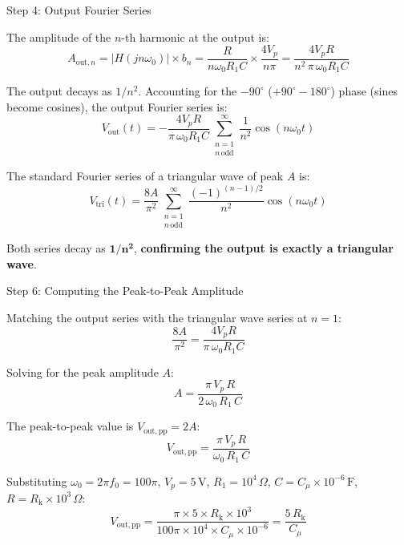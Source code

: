 \documentclass{beamer}
\numberwithin{equation}{section}
\theoremstyle{remark}
\begin{document}
\begin{frame}{Step 4: Output Fourier Series}
 
The amplitude of the $n$-th harmonic at the output is:
\[
  A_{\mathrm{out},n}
  = \left|H(jn\omega_0)\right| \times b_n
  = \frac{R}{n\omega_0 R_1 C} \times \frac{4V_p}{n\pi}
  = \frac{4V_p R}{n^2\,\pi\,\omega_0 R_1 C}
\]
 
The output decays as $1/n^2$. Accounting for the $-90^\circ$ ($+90^\circ - 180^\circ$) phase
(sines become cosines), the output Fourier series is:
\[
  V_{\mathrm{out}}(t)
  = -\frac{4V_p R}{\pi\,\omega_0 R_1 C}
    \sum_{\substack{n=1 \\ n\,\mathrm{odd}}}^{\infty}
    \frac{1}{n^2}\cos(n\omega_0 t)
\]
 
The standard Fourier series of a triangular wave of peak $A$ is:
\[
  V_{\mathrm{tri}}(t)
  = \frac{8A}{\pi^2}
    \sum_{\substack{n=1 \\ n\,\mathrm{odd}}}^{\infty}
    \frac{(-1)^{(n-1)/2}}{n^2}\cos(n\omega_0 t)
\]
 
Both series decay as $\mathbf{1/n^2}$, \textbf{confirming the output
is exactly a triangular wave}.
 
\end{frame}
 
 
\begin{frame}{Step 6: Computing the Peak-to-Peak Amplitude}
 
Matching the output series with the triangular wave series at $n=1$:
\[
  \frac{8A}{\pi^2} = \frac{4V_p R}{\pi\,\omega_0 R_1 C}
\]
 
Solving for the peak amplitude $A$:
\[
  A = \frac{\pi\,V_p\,R}{2\,\omega_0\,R_1\,C}
\]
 
The peak-to-peak value is $V_{\mathrm{out,pp}} = 2A$:
\[
  V_{\mathrm{out,pp}}
  = \frac{\pi\,V_p\,R}{\omega_0\,R_1\,C}
\]
 
Substituting $\omega_0 = 2\pi f_0 = 100\pi$, $V_p = 5\,\mathrm{V}$,
$R_1 = 10^4\,\Omega$, $C = C_\mu \times 10^{-6}\,\mathrm{F}$, $R = R_{\mathrm{k}}\times10^3\,\Omega$:
\[
  V_{\mathrm{out,pp}}
  = \frac{\pi \times 5 \times R_{\mathrm{k}}\times10^3}
         {100\pi \times 10^4 \times C_\mu\times10^{-6}}
  = \frac{5\,R_{\mathrm{k}}}{C_\mu}
\]
 
\end{frame}
 
\end{document}

